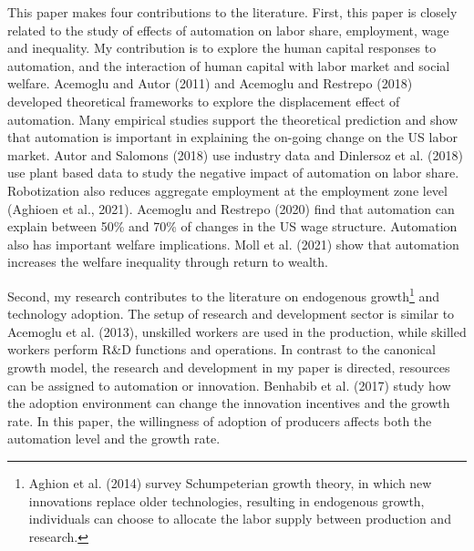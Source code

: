 \documentclass[12pt]{article}
\begin{document}
This paper makes four contributions to the literature. First, this paper is closely related to the study of effects of automation on labor share, employment, wage and inequality. My contribution is to explore the human capital responses to automation, and the interaction of human capital with labor market and social welfare. Acemoglu and Autor (2011)\nocite{AcemogluAutor2011} and Acemoglu and Restrepo (2018)\nocite{AcemogluRestrepo2018} developed theoretical frameworks to explore the displacement effect of automation. Many empirical studies support the theoretical prediction and show that automation is important in explaining the on-going change on the US labor market. Autor and Salomons (2018)\nocite{AutorSalomons2018} use industry data and Dinlersoz et al. (2018)\nocite{Dinlersozetal2018} use plant based data to study the negative impact of automation on labor share. Robotization also reduces aggregate employment at the employment zone level (Aghioen et al., 2021\nocite{Aghioenetal2021}). Acemoglu and Restrepo (2020)\nocite{AcemogluRestrepo2020} find that automation can explain between 50\% and 70\% of changes in the US wage structure. Automation also has important welfare implications. Moll et al. (2021)\nocite{Molletal2021} show that automation increases the welfare inequality through return to wealth. 

Second, my research contributes to the literature on endogenous growth\footnote{Aghion et al. (2014)\nocite{Aghionetal2014} survey Schumpeterian growth theory, in which new innovations replace older technologies, resulting in endogenous growth, individuals can choose to allocate the labor supply between production and research.} and technology adoption. The setup of research and development sector is similar to Acemoglu et al. (2013)\nocite{Acemogluetal2013}, unskilled workers are used in the production, while skilled workers perform R\&D functions and operations. In contrast to the canonical growth model, the research and development in my paper is directed, resources can be assigned to automation or innovation. Benhabib et al. (2017)\nocite{Benhabibetal2017} study how the adoption environment can change the innovation incentives and the growth rate. In this paper, the willingness of adoption of producers affects both the automation level and the growth rate. 
\end{document}

